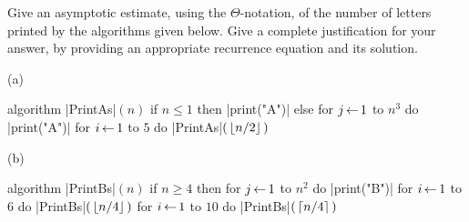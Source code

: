 \documentclass[11pt]{article}
\begin{document}
	

\medskip


\lineacross



\newcommand{\calT}{{\mathcal{T}}}

\begin{problem}
Give an asymptotic estimate, using the $\Theta$-notation, of the number of letters printed by the
algorithms given below. Give a complete justification for your answer, by providing an appropriate recurrence
equation and its solution.

\medskip
\noindent
(a) 
\hspace{0.01in}
%
\begin{minipage}[t]{2.4in}
\strut\vspace*{- 2.5 \baselineskip}\newline 

\begin{program}
algorithm |PrintAs|$(n)$
   if $n\le 1$ then
      |print("A")|
   else
      for $j{\,\leftarrow\,} 1$ to $n^3$
         do |print("A")|
      for $i{\,\leftarrow\,} 1$ to $5$ do
         |PrintAs|$(\,{\left\lfloor n/2\right\rfloor}\,)$
\end{program}
\end{minipage}
%
\hspace{0.4in}
(b) 
\hspace{0.01in}
%
\begin{minipage}[t]{2.4in}
\strut\vspace*{- 2.5 \baselineskip}\newline 

\begin{program}
algorithm |PrintBs|$(n)$
   if $n\ge 4$ then
      for $j{\,\leftarrow\,} 1$ to $n^2$
         do |print("B")|
      for $i{\,\leftarrow\,} 1$ to $6$ do
         |PrintBs|$(\,{\left\lfloor n/4\right\rfloor}\,)$
      for $i{\,\leftarrow\,} 1$ to $10$ do
         |PrintBs|$(\,{\left\lceil n/4\right\rceil}\,)$
\end{program}
\end{minipage}


\end{problem}
\end{document}
